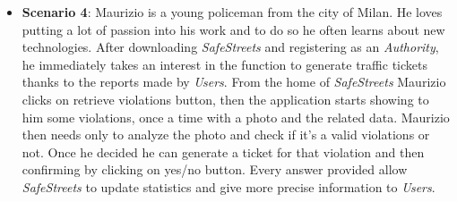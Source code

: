 \documentclass{article}
\begin{document}
\begin{itemize}
    \item \textbf{Scenario 4}:
    Maurizio is a young policeman from the city of Milan. He loves putting a lot of passion into his work and to do so he often learns about new 
    technologies. After downloading \textit{SafeStreets} and registering as an \textit{Authority}, he immediately takes an interest in the function to generate traffic tickets 
    thanks to the reports made by \textit{Users}. From the home of \textit{SafeStreets} Maurizio clicks on retrieve violations button, then the application 
    starts showing to him some violations, once a time with a photo and the related data. Maurizio then needs only to analyze the photo and
    check if it's a valid violations or not. Once he decided he can generate a ticket for that violation and then confirming by clicking on yes/no button. 
    Every answer provided allow \textit{SafeStreets} to update statistics and give more precise information to \textit{Users}. 
\end{itemize}
\end{document}
